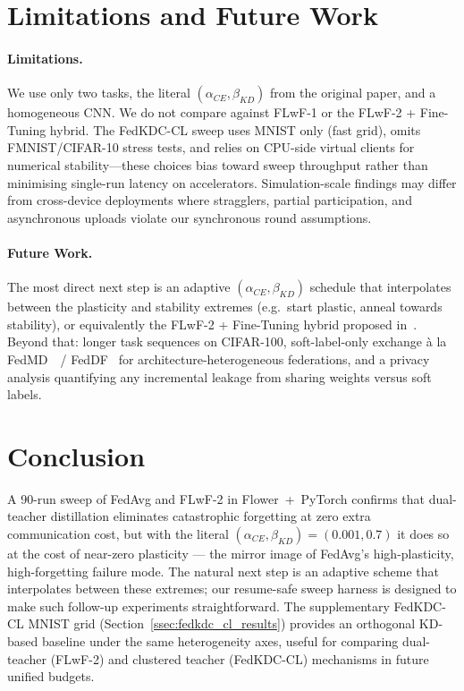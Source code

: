 \documentclass[journal]{IEEEtran}
\begin{document}
\section{Limitations and Future Work}
\label{sec:limitations}

\paragraph{Limitations.}
We use only two tasks, the literal $(\alpha_{CE},\beta_{KD})$ from
the original paper, and a homogeneous CNN. We do not compare against
FLwF-1 or the FLwF-2 + Fine-Tuning hybrid.
The FedKDC-CL sweep uses MNIST only (fast grid), omits FMNIST/CIFAR-10
stress tests, and relies on CPU-side virtual clients for numerical
stability---these choices bias toward sweep throughput rather than minimising
single-run latency on accelerators.
Simulation-scale findings may differ from cross-device deployments where
stragglers, partial participation, and asynchronous uploads violate our
synchronous round assumptions.

\paragraph{Future Work.}
The most direct next step is an adaptive
$(\alpha_{CE},\beta_{KD})$ schedule that interpolates between the
plasticity and stability extremes (e.g.\ start plastic, anneal
towards stability), or equivalently the FLwF-2 + Fine-Tuning hybrid
proposed in~\cite{flwf}. Beyond that: longer task sequences on
CIFAR-100, soft-label-only exchange à la FedMD~\cite{fedmd}~/
FedDF~\cite{feddf} for architecture-heterogeneous federations, and
a privacy analysis quantifying any incremental leakage from sharing
weights versus soft labels.

\section{Conclusion}
\label{sec:conclusion}

A 90-run sweep of FedAvg and FLwF-2 in Flower~+~PyTorch confirms that
dual-teacher distillation eliminates catastrophic forgetting at zero
extra communication cost, but with the literal
$(\alpha_{CE},\beta_{KD})=(0.001,0.7)$ it does so at the cost of
near-zero plasticity --- the mirror image of FedAvg's high-plasticity,
high-forgetting failure mode. The natural next step is an adaptive
scheme that interpolates between these extremes; our resume-safe
sweep harness is designed to make such follow-up experiments
straightforward.
The supplementary FedKDC-CL MNIST grid (Section~\ref{ssec:fedkdc_cl_results})
provides an orthogonal KD-based baseline under the same heterogeneity
axes, useful for comparing dual-teacher (FLwF-2) and clustered teacher
(FedKDC-CL) mechanisms in future unified budgets.
\end{document}
